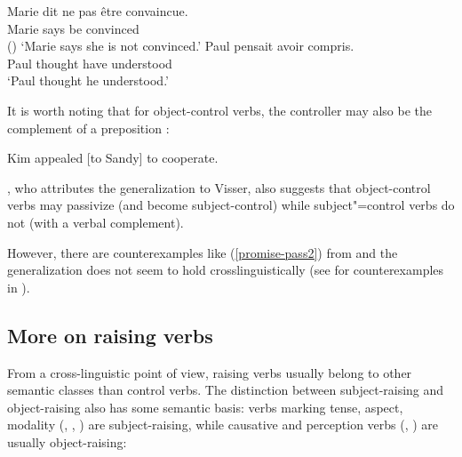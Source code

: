 \documentclass[output=paper
	        ,collection
	        ,collectionchapter
 	        ,biblatex
                ,babelshorthands
                ,newtxmath
                ,draftmode
                ,colorlinks, citecolor=brown
]{langscibook}
\begin{document}
\begin{exe}
\ex \begin{xlist}
\ex 
\gll Marie dit {ne pas} \^etre convaincue.\\
     Marie says  be convinced \\\hfill()
\glt `Marie says she is not convinced.'	
\ex 
\gll Paul pensait  avoir compris. \\
     Paul thought have understood \\
\glt `Paul thought he understood.'
 \end{xlist}
\end{exe}

It is worth noting that for object-control verbs, the controller may also be the complement of a preposition \citep[]{PollardandSag1994}:

\begin{exe}
\ex Kim appealed [to Sandy] to cooperate. \label{to}
\end{exe}


 
\citet[]{Bresnan1982}, who attributes the generalization to Visser, also suggests that
object-control verbs may passivize (and become subject-control) while subject"=control verbs do not
(with a verbal complement). 

\eal
{}\label{persuade-pass}
\label{promise-pass}
\label{promise-pass2}
\zl
However, there are counterexamples like (\ref{promise-pass2}) from \citet{JB1976a-u}\addpages and the generalization does not seem to
hold crosslinguistically (see  for counterexamples in ). 
 
\subsection{More on raising verbs}
\label{sec-more-on-raising-verbs}

From a cross-linguistic point of view, raising verbs usually belong to other semantic classes than
control verbs. The distinction between subject-raising and object-raising also has some semantic
basis: verbs marking tense, aspect, modality (, , ) are
subject-raising, while causative and perception verbs (, ) are usually
object-raising:
\end{document}
